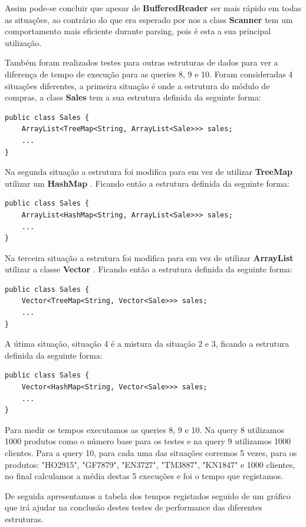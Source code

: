 \documentclass[10pt] {article}
\begin{document}
\newpage

Assim pode-se concluir que apesar de  \color{blue}\textbf{BufferedReader}\color{black} ser mais rápido em todas as situações, ao contrário do que era esperado por nos a class  \color{blue}\textbf{Scanner}\color{black} tem um comportamento mais eficiente durante parsing, pois é esta a sua principal utilização.

\par Também foram realizados testes para outras estruturas de dados para ver a diferença de tempo de execução para as
queries 8, 9 e 10. Foram consideradas 4 situações diferentes, a primeira situação é onde a estrutura do módulo de
compras, a class \color{blue} \textbf{Sales} \color{black} tem a sua estrutura definida da seguinte forma:

\begin{lstlisting}
public class Sales {
	ArrayList<TreeMap<String, ArrayList<Sale>>> sales;
	...
}
\end{lstlisting}

\par Na segunda situação a estrutura foi modifica para em vez de utilizar \color{blue} \textbf{TreeMap} \color{black} utilizar um
\color{blue} \textbf{HashMap} \color{black} . Ficando então a estrutura definida da seguinte forma:

\begin{lstlisting}
public class Sales {
	ArrayList<HashMap<String, ArrayList<Sale>>> sales;
	...
}
\end{lstlisting}

\par Na terceira situação a estrutura foi modifica para em vez de utilizar \color{blue} \textbf{ArrayList} \color{black} utilizar a
classe  \color{blue} \textbf{Vector} \color{black} . Ficando então a estrutura definida da seguinte forma:

\begin{lstlisting}
public class Sales {
	Vector<TreeMap<String, Vector<Sale>>> sales;
	...
}
\end{lstlisting}

\par A útima situação, situação 4 é a mistura da situação 2 e 3, ficando a estrutura definida da seguinte forma:

\begin{lstlisting}
public class Sales {
	Vector<HashMap<String, Vector<Sale>>> sales;
	...
}
\end{lstlisting}

\par Para medir os tempos executamos as queries 8, 9 e 10. Na query 8 utilizamos 1000 produtos como o número base
para os testes e na query 9 utilizamos 1000 clientes. Para a query 10, para cada uma das situações corremos 5 vezes,
para os produtos: "HO2915", "GF7879", "EN3727", "TM3887", "KN1847" e 1000 clientes, no final calculamos a média destas 5
execuções e foi o tempo que registamos.
\par De seguida apresentamos a tabela dos tempos registados seguido de um gráfico que irá ajudar na conclusão destes
testes de performance das diferentes estruturas.
\end{document}
